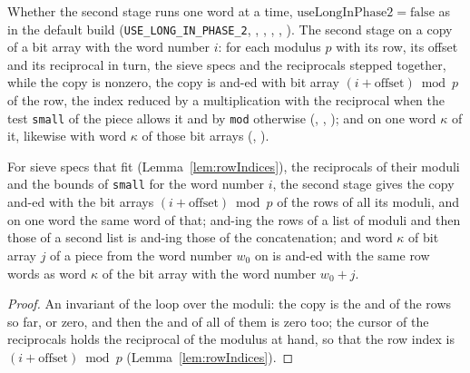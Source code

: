 \begin{definition}\label{def:secondStage}
  \leanok
  Whether the second stage runs one word at a time, $\mathrm{useLongInPhase2} = \mathrm{false}$ as
  in the default build (\verb|USE_LONG_IN_PHASE_2|, ,
  , , ,
  ). The second stage on a copy of a bit array with the word number $i$:
  for each modulus $p$ with its row, its offset and its reciprocal in turn, the sieve specs and the
  reciprocals stepped together, while the copy is nonzero, the copy is and-ed with bit array
  $(i + \mathrm{offset}) \bmod p$ of the row, the index reduced by a multiplication with the
  reciprocal when the test \verb|small| of the piece allows it and by \verb|mod| otherwise
  (, , ); and
  on one word $\kappa$ of it, likewise with word $\kappa$ of those bit arrays
  (, ).
\end{definition}

\begin{lemma}\label{lem:secondStage}
  \leanok
  For sieve specs that fit (Lemma~\ref{lem:rowIndices}), the reciprocals of their moduli and the
  bounds of \verb|small| for the word number $i$, the second stage gives the copy and-ed with the
  bit arrays $(i + \mathrm{offset}) \bmod p$ of the rows of all its moduli, and on one word the same
  word of that; and-ing the rows of a list of moduli and then those of a second list is and-ing
  those of the concatenation; and word $\kappa$ of bit array $j$ of a piece from the word number
  $w_0$ on is and-ed with the same row words as word $\kappa$ of the bit array with the word number
  $w_0 + j$.
\end{lemma}

\begin{proof}
  \leanok
  An invariant of the loop over the moduli: the copy is the and of the rows so far, or zero, and
  then the and of all of them is zero too; the cursor of the reciprocals holds the reciprocal of the
  modulus at hand, so that the row index is $(i + \mathrm{offset}) \bmod p$
  (Lemma~\ref{lem:rowIndices}).
\end{proof}


